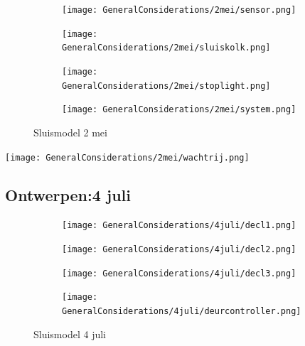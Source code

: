 \documentclass{article}
\begin{document}
	\begin{figure}
		\centering
		\begin{subfigure}{0.45\linewidth}
			\texttt{[image: GeneralConsiderations/2mei/sensor.png]}
			\caption{}
			\label{fig:1a}
		\end{subfigure}\hfill
		\begin{subfigure}{0.45\linewidth}
			\texttt{[image: GeneralConsiderations/2mei/sluiskolk.png]}
			\caption{}
			\label{fig:1a}
		\end{subfigure}
		
		\begin{subfigure}{0.45\linewidth}
			\texttt{[image: GeneralConsiderations/2mei/stoplight.png]}
			\caption{}
			\label{fig:1a}
		\end{subfigure}\hfill
		\begin{subfigure}{0.45\linewidth}
			\texttt{[image: GeneralConsiderations/2mei/system.png]}
			\caption{}
			\label{fig:1a}
		\end{subfigure}
		\caption{Sluismodel 2 mei}
		\label{fig:1}
	\end{figure}
	\texttt{[image: GeneralConsiderations/2mei/wachtrij.png]}
	\newpage
	\subsection{Ontwerpen:4 juli }
	
	
	
	\begin{figure}
		\centering
		\begin{subfigure}{0.45\linewidth}
			\texttt{[image: GeneralConsiderations/4juli/decl1.png]}
			\caption{}
			\label{fig:1a}
		\end{subfigure}\hfill
		\begin{subfigure}{0.45\linewidth}
			\texttt{[image: GeneralConsiderations/4juli/decl2.png]}
			\caption{}
			\label{fig:1a}
		\end{subfigure}
		
		\begin{subfigure}{0.45\linewidth}
			\texttt{[image: GeneralConsiderations/4juli/decl3.png]}
			\caption{}
			\label{fig:1a}
		\end{subfigure}\hfill
		\begin{subfigure}{0.45\linewidth}
			\texttt{[image: GeneralConsiderations/4juli/deurcontroller.png]}
			\caption{}
			\label{fig:1a}
		\end{subfigure}
		\caption{Sluismodel 4 juli}
		\label{fig:1}
	\end{figure}
	
\end{document}
